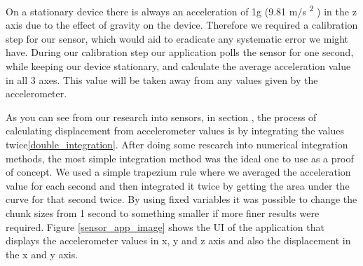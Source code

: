 On a stationary device there is always an acceleration of 1g (9.81 m/s \textsuperscript{2} )
in the z axis due to the effect of gravity on the device. Therefore we required a calibration step for our sensor, which would aid to eradicate any systematic error we might have. During our calibration step our application polls the sensor for one second, while keeping our device stationary, and calculate the average acceleration value in all 3 axes. This value will be taken away from any values given by the accelerometer.

As you can see from our research into sensors, in section , the process of calculating displacement from accelerometer values is by integrating the values twice\ref{double_integration}. After doing some research into numerical integration methods, the most simple integration method was the ideal one to use as a proof of concept. We used a simple trapezium rule where we averaged the acceleration value for each second and then integrated it twice by getting the area under the curve for that second twice. By using fixed variables it was possible to change the chunk sizes from 1 second to something smaller if more finer results were required.
Figure \ref{sensor_app_image} shows the UI of the application that displays the accelerometer values in x, y and z axis and also the displacement in the x and y axis.

